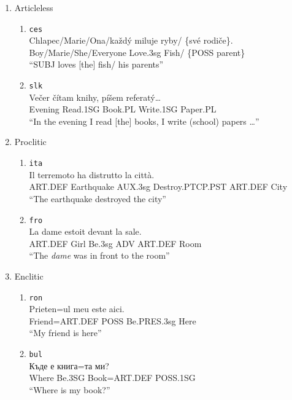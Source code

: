 \documentclass[a4paper,twoside,12pt,chapterprefix=false,listof=flat]{scrartcl}
\providecommand{\tightlist}{%
  \setlength{\itemsep}{0pt}\setlength{\parskip}{0pt}}
\theoremstyle{plain} %
\theoremstyle{definition}
\theoremstyle{remark}
\begin{document}
\begin{enumerate}
\def\labelenumi{(\arabic{enumi})}
\tightlist
\item
  Articleless \label{exm:dpNo}

  \begin{enumerate}
  \def\labelenumii{\alph{enumii}.}
  \tightlist
  \item
    \texttt{ces} \citep[ 14]{veselovska2014}\\
    \gll    Chlapec/Marie/Ona/každý miluje ryby/ \{své rodiče\}.\\
    Boy/Marie/She/Everyone Love.3sg Fish/ \{POSS parent\}\\
    \glt    \enquote{SUBJ loves {[}the{]} fish/ his parents}
  \item
    \texttt{slk} \citep[ 113]{krizomkrazomA1}\\
    \gll    Večer čítam knihy, píšem referatý\ldots{}\\
    Evening Read.1SG Book.PL Write.1SG Paper.PL\\
    \glt    \enquote{In the evening I read {[}the{]} books, I write
    (school) papers \ldots{}}
  \end{enumerate}
\item
  Proclitic \label{exm:dpPre}

  \begin{enumerate}
  \def\labelenumii{\alph{enumii}.}
  \tightlist
  \item
    \texttt{ita} \citep[ 60]{bianco2017}\\
    \gll    Il terremoto ha distrutto la città.\\
    ART.DEF Earthquake AUX.3sg Destroy.PTCP.PST ART.DEF City\\
    \glt    \enquote{The earthquake destroyed the city}
  \item
    \texttt{fro} \citep[ 3261]{dedole2008}\\
    \gll    La dame estoit devant la sale.\\
    ART.DEF Girl Be.3sg ADV ART.DEF Room\\
    \glt    \enquote{The \emph{dame} was in front to the room}
  \end{enumerate}
\item
  Enclitic

  \begin{enumerate}
  \def\labelenumii{\alph{enumii}.}
  \tightlist
  \item
    \texttt{ron} \citep[ 45]{cojocaru2003} \label{exm:dpRon}\\
    \gll    Prieten=ul meu este aici.\\
    Friend=ART.DEF POSS Be.PRES.3sg Here\\
    \glt    \enquote{My friend is here}
  \item
    \texttt{bul} \citep[ 37]{leafgren2011} \label{exm:dpBul}\\
    \gll    Къде е книга=та ми?\\
    Where Be.3SG Book=ART.DEF POSS.1SG\\
    \glt    \enquote{Where is my book?}
  \end{enumerate}
\end{enumerate}
\end{document}
